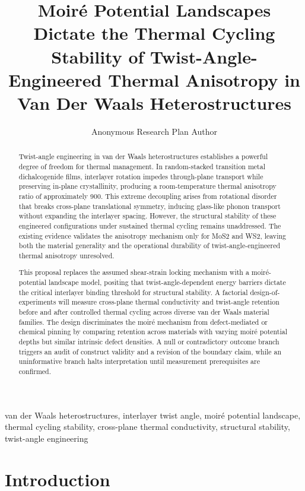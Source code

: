 \documentclass[conference]{IEEEtran}
\begin{document}
\title{Moiré Potential Landscapes Dictate the Thermal Cycling Stability of Twist-Angle-Engineered Thermal Anisotropy in Van Der Waals Heterostructures}\author{Anonymous Research Plan Author}\maketitle

\begin{abstract}
Twist-angle engineering in van der Waals heterostructures establishes a powerful degree of freedom for thermal management. In random-stacked transition metal dichalcogenide films, interlayer rotation impedes through-plane transport while preserving in-plane crystallinity, producing a room-temperature thermal anisotropy ratio of approximately 900. This extreme decoupling arises from rotational disorder that breaks cross-plane translational symmetry, inducing glass-like phonon transport without expanding the interlayer spacing. However, the structural stability of these engineered configurations under sustained thermal cycling remains unaddressed. The existing evidence validates the anisotropy mechanism only for MoS2 and WS2, leaving both the material generality and the operational durability of twist-angle-engineered thermal anisotropy unresolved.

This proposal replaces the assumed shear-strain locking mechanism with a moiré-potential landscape model, positing that twist-angle-dependent energy barriers dictate the critical interlayer binding threshold for structural stability. A factorial design-of-experiments will measure cross-plane thermal conductivity and twist-angle retention before and after controlled thermal cycling across diverse van der Waals material families. The design discriminates the moiré mechanism from defect-mediated or chemical pinning by comparing retention across materials with varying moiré potential depths but similar intrinsic defect densities. A null or contradictory outcome branch triggers an audit of construct validity and a revision of the boundary claim, while an uninformative branch halts interpretation until measurement prerequisites are confirmed.
\end{abstract}
\begin{IEEEkeywords}
van der Waals heterostructures, interlayer twist angle, moiré potential landscape, thermal cycling stability, cross-plane thermal conductivity, structural stability, twist-angle engineering
\end{IEEEkeywords}\section{Introduction}
\end{document}
